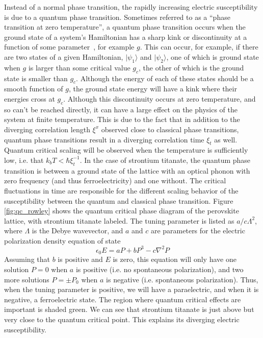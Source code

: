 \documentclass{thesis-umich}
\begin{document}
Instead of a normal phase transition, the rapidly increasing electric susceptibility is due to a quantum phase transition. Sometimes referred to as a ``phase transition at zero temperature'', a quantum phase transition occurs when the ground state of a system's Hamiltonian has a sharp kink or discontinuity at a function of some parameter~\cite{Coleman2005}, for example $g$. This can occur, for example, if there are two states of a given Hamiltonian, $|\psi_1\rangle$ and $|\psi_2\rangle$, one of which is ground state when $g$ is larger than some critical value $g_c$, the other of which is the ground state is smaller than $g_c$. Although the energy of each of these states should be a smooth function of $g$, the ground state energy will have a kink where their energies cross at $g_c$. Although this discontinuity occurs at zero temperature, and so can't be reached directly, it can have a large effect on the physics of the system at finite temperature. This is due to the fact that in addition to the diverging correlation length $\xi^x$ observed close to classical phase transitions, quantum phase transitions result in a diverging correlation time $\xi_t$ as well. Quantum critical scaling will be observed when the temperature is sufficiently low, i.e. that $k_bT < \hbar \xi_t^{-1}$. In the case of strontium titanate, the quantum phase transition is between a ground state of the lattice with an optical phonon with zero frequency (and thus ferroelectricity) and one without. The critical fluctuations in time are responsible for the different scaling behavior of the susceptibility between the quantum and classical phase transition. Figure \ref{fig:qc_rowley} shows the quantum critical phase diagram of the perovskite lattice, with strontium titanate labeled. The tuning parameter is listed as $a/c\Lambda^2$, where $\Lambda$ is the Debye wavevector, and $a$ and $c$ are parameters for the electric polarization density equation of state~\cite{Rowley2014}
\[ \epsilon_0 E = a P + b P^3 - c \nabla^2 P \]
Assuming that $b$ is positive and $E$ is zero, this equation will only have one solution $P=0$ when $a$ is positive (i.e. no spontaneous polarization), and two more solutions $P = \pm P_0$ when $a$ is negative (i.e. spontaneous polarization). Thus, when the tuning parameter is positive, we will have a paraelectric, and when it is negative, a ferroelectric state. The region where quantum critical effects are important is shaded green. We can see that strontium titanate is just above but very close to the quantum critical point. This explains its diverging electric susceptibility.
\end{document}
